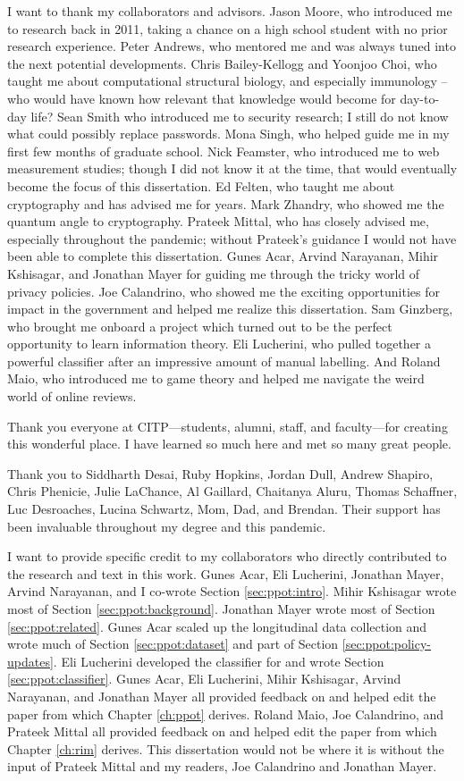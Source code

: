 I want to thank my collaborators and advisors. Jason Moore, who introduced me to research back in 2011, taking a chance on a high school student with no prior research experience. Peter Andrews, who mentored me and was always tuned into the next potential developments. Chris Bailey-Kellogg and Yoonjoo Choi, who taught me about computational structural biology, and especially immunology -- who would have known how relevant that knowledge would become for day-to-day life? Sean Smith who introduced me to security research; I still do not know what could possibly replace passwords. Mona Singh, who helped guide me in my first few months of graduate school. Nick Feamster, who introduced me to web measurement studies; though I did not know it at the time, that would eventually become the focus of this dissertation. Ed Felten, who taught me about cryptography and has advised me for years. Mark Zhandry, who showed me the quantum angle to cryptography. Prateek Mittal, who has closely advised me, especially throughout the pandemic; without Prateek's guidance I would not have been able to complete this dissertation. Gunes Acar, Arvind Narayanan, Mihir Kshisagar, and Jonathan Mayer for guiding me through the tricky world of privacy policies. Joe Calandrino, who showed me the exciting opportunities for impact in the government and helped me realize this dissertation. Sam Ginzberg, who brought me onboard a project which turned out to be the perfect opportunity to learn information theory. Eli Lucherini, who pulled together a powerful classifier after an impressive amount of manual labelling. And Roland Maio, who introduced me to game theory and helped me navigate the weird world of online reviews.

Thank you everyone at CITP---students, alumni, staff, and faculty---for creating this wonderful place. I have learned so much here and met so many great people.

Thank you to Siddharth Desai, Ruby Hopkins, Jordan Dull, Andrew Shapiro, Chris Phenicie, Julie LaChance, Al Gaillard, Chaitanya Aluru, Thomas Schaffner, Luc Desroaches, Lucina Schwartz, Mom, Dad, and Brendan. Their support has been invaluable throughout my degree and this pandemic.

I want to provide specific credit to my collaborators who directly contributed to the research and text in this work. Gunes Acar, Eli Lucherini, Jonathan Mayer, Arvind Narayanan, and I co-wrote Section \ref{sec:ppot:intro}. Mihir Kshisagar wrote most of Section \ref{sec:ppot:background}. Jonathan Mayer wrote most of Section \ref{sec:ppot:related}. Gunes Acar scaled up the longitudinal data collection and wrote much of Section \ref{sec:ppot:dataset} and part of Section \ref{sec:ppot:policy-updates}. Eli Lucherini developed the classifier for and wrote Section \ref{sec:ppot:classifier}. Gunes Acar, Eli Lucherini, Mihir Kshisagar, Arvind Narayanan, and Jonathan Mayer all provided feedback on and helped edit the paper from which Chapter \ref{ch:ppot} derives. Roland Maio, Joe Calandrino, and Prateek Mittal all provided feedback on and helped edit the paper from which Chapter \ref{ch:rim} derives. This dissertation would not be where it is without the input of Prateek Mittal and my readers, Joe Calandrino and Jonathan Mayer.